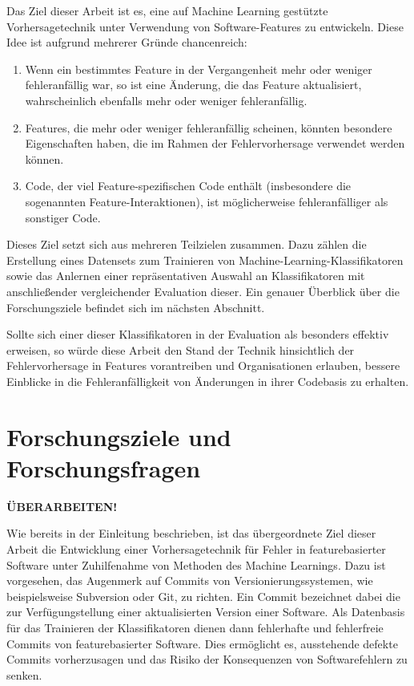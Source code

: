 Das Ziel dieser Arbeit ist es, eine auf Machine Learning gestützte Vorhersagetechnik unter Verwendung von Software-Features zu entwickeln. Diese Idee ist aufgrund mehrerer Gründe chancenreich:

\begin{enumerate}
\item Wenn ein bestimmtes Feature in der Vergangenheit mehr oder weniger fehleranfällig war, so ist eine Änderung, die das Feature aktualisiert, wahrscheinlich ebenfalls mehr oder weniger fehleranfällig. 
\item Features, die mehr oder weniger fehleranfällig scheinen, könnten besondere Eigenschaften haben, die im Rahmen der Fehlervorhersage verwendet werden können.
\item Code, der viel Feature-spezifischen Code enthält (insbesondere die sogenannten Feature-Interaktionen), ist möglicherweise fehleranfälliger als sonstiger Code.
\end{enumerate}

Dieses Ziel setzt sich aus mehreren Teilzielen zusammen. Dazu zählen die Erstellung eines Datensets zum Trainieren von Machine-Learning-Klassifikatoren sowie das Anlernen einer repräsentativen Auswahl an Klassifikatoren mit anschließender vergleichender Evaluation dieser. Ein genauer Überblick über die Forschungsziele befindet sich im nächsten Abschnitt.

Sollte sich einer dieser Klassifikatoren in der Evaluation als besonders effektiv erweisen, so würde diese Arbeit den Stand der Technik hinsichtlich der Fehlervorhersage in Features vorantreiben und Organisationen erlauben, bessere Einblicke in die Fehleranfälligkeit von Änderungen in ihrer Codebasis zu erhalten.

\section{Forschungsziele und Forschungsfragen}

\textbf{ÜBERARBEITEN!}

Wie bereits in der Einleitung beschrieben, ist das übergeordnete Ziel dieser Arbeit die Entwicklung einer Vorhersagetechnik für Fehler in featurebasierter Software unter Zuhilfenahme von Methoden des Machine Learnings. Dazu ist vorgesehen, das Augenmerk auf Commits von Versionierungssystemen, wie beispielsweise Subversion oder Git, zu richten. Ein Commit bezeichnet dabei die zur Verfügungstellung einer aktualisierten Version einer Software. Als Datenbasis für das Trainieren der Klassifikatoren dienen dann fehlerhafte und fehlerfreie Commits von featurebasierter Software. Dies ermöglicht es, ausstehende defekte Commits vorherzusagen und das Risiko der Konsequenzen von Softwarefehlern zu senken.

